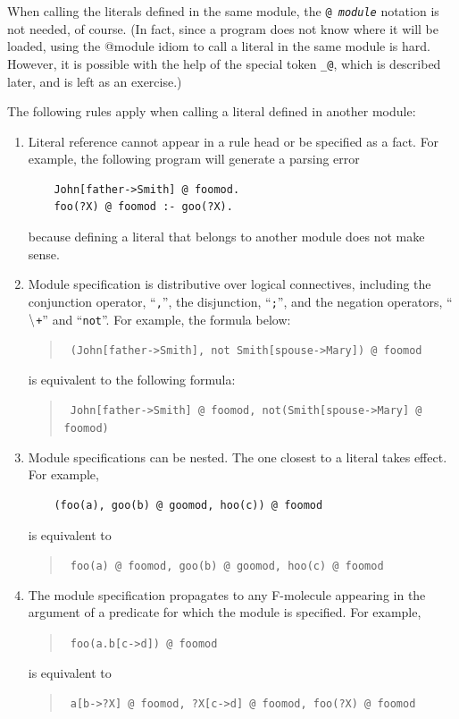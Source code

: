 \documentclass[11pt]{article}
\makeatletter
\newcommand{\thismodule}{{\tt \_@}\xspace}
\newcommand{\NAF}{\mbox{\tt \ensuremath{\tt\backslash}+}\xspace}
\newcommand{\TNOT}{{{\tt not}}\xspace}
\makeatother
\begin{document}
When calling the literals defined in the same module, the {\tt @{\it
    module}} notation is not needed, of course. (In fact, since a program
does not know where it will be loaded, using the @module idiom to call a
literal in the same module is hard. However, it is possible with the help
of the special token \thismodule, which is described later, and is left
as an exercise.)

The following rules apply when calling a literal defined in another module:
\begin{enumerate}
\item Literal reference cannot appear in a rule head or be specified as
  a fact. For example, the following program will generate
  a parsing error
  \begin{verbatim}
    John[father->Smith] @ foomod.
    foo(?X) @ foomod :- goo(?X).
  \end{verbatim}
  because defining a literal that belongs to another module does not make
  sense.
  
\item Module specification is distributive over logical connectives,
  including the conjunction operator, ``\verb|,|'', the disjunction,
  ``\verb|;|'', and the negation operators, ``\NAF'' and
  ``\TNOT''. For example, the formula below:
  \begin{quote}
    {\tt
    (John[father->Smith], \TNOT Smith[spouse->Mary]) @ foomod
    }
  \end{quote}
  is equivalent to the following formula:
  \begin{quote}
    {\tt
    John[father->Smith] @ foomod, \TNOT (Smith[spouse->Mary] @ foomod)
    }
  \end{quote}

\item Module specifications can be nested. The one closest to a literal
  takes effect. For example,
  \begin{verbatim}
    (foo(a), goo(b) @ goomod, hoo(c)) @ foomod
  \end{verbatim}
  is equivalent to
  \begin{quote}
    {\tt
      foo(a) @ foomod, goo(b) @ goomod, hoo(c) @ foomod
    }
  \end{quote}
  
\item The module specification propagates to any F-molecule appearing
  in the argument of a predicate for which the module is
  specified. For example,
  \begin{quote}
    {\tt
    foo(a.b[c->d]) @ foomod
    }
  \end{quote}
  is equivalent to
  \begin{quote}
    {\tt
    a[b->?X] @ foomod, ?X[c->d] @ foomod, foo(?X) @ foomod
    }
  \end{quote}
  

\end{enumerate}
\end{document}

